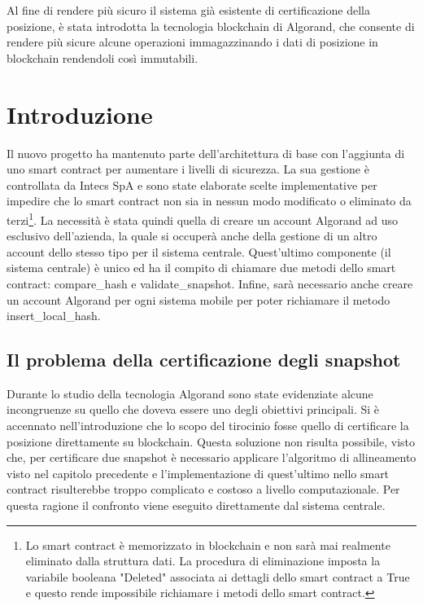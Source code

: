 Al fine di rendere più sicuro il sistema già esistente di certificazione della posizione, è stata introdotta la tecnologia blockchain di Algorand, che consente di rendere più sicure alcune operazioni immagazzinando i dati di posizione in blockchain rendendoli così immutabili.

\section{Introduzione}
Il nuovo progetto ha mantenuto parte dell'architettura di base con l'aggiunta di uno smart contract per aumentare i livelli di sicurezza. La sua gestione è controllata da Intecs SpA e sono state elaborate scelte implementative per impedire che lo smart contract non sia in nessun modo modificato o eliminato da terzi\footnote{Lo smart contract è memorizzato in blockchain e non sarà mai realmente eliminato dalla struttura dati. La procedura di eliminazione imposta la variabile booleana "Deleted" associata ai dettagli dello smart contract a True e questo rende impossibile richiamare i metodi dello smart contract.}. La necessità è stata quindi quella di creare un account Algorand ad uso esclusivo dell'azienda, la quale si occuperà anche della gestione di un altro account dello stesso tipo per il sistema centrale. Quest'ultimo componente (il sistema centrale) è unico ed ha il compito di chiamare due metodi dello smart contract: compare\_hash e validate\_snapshot. Infine, sarà necessario anche creare un account Algorand per ogni sistema mobile per poter richiamare il metodo insert\_local\_hash. 

\subsection{Il problema della certificazione degli snapshot}
Durante lo studio della tecnologia Algorand sono state evidenziate alcune incongruenze su quello che doveva essere uno degli obiettivi principali. Si è accennato nell'introduzione che lo scopo del tirocinio fosse quello di certificare la posizione direttamente su blockchain. Questa soluzione non risulta possibile, visto che, per certificare due snapshot è necessario applicare l'algoritmo di allineamento visto nel capitolo precedente e l'implementazione di quest'ultimo nello smart contract risulterebbe troppo complicato e costoso a livello computazionale. Per questa ragione il confronto viene eseguito direttamente dal sistema centrale.

